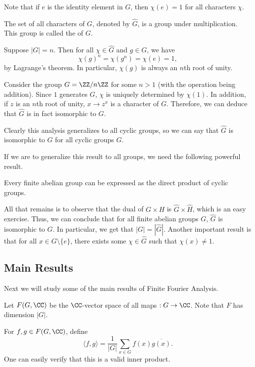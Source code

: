 \documentclass{scrartcl}
\begin{document}
Note that if $e$ is the identity element in $G$, then $\chi (e) = 1$ for all characters $\chi$. 

\begin{definition}
	The set of all characters of $G$, denoted by $\widehat{G}$, is a group under multiplication. 
	This group is called the  of $G$. 
\end{definition}

Suppose $|G|=n$. Then for all $\chi\in \widehat{G}$ and $g\in G$, we have 
$$\chi (g)^n = \chi(g^n) = \chi (e) = 1,$$
by Lagrange's theorem. In particular, $\chi(g)$ is always an $n$th root of unity. 

\begin{example} 
	\label{ex:cyclic}
	Consider the group $G = \ZZ/n\ZZ$ for some $n>1$ (with the operation being addition).
	Since $1$ generates $G$, $\chi$ is uniquely determined by $\chi(1)$. 
	In addition, if $z$ is an $n$th root of unity, $x\rightarrow z^x$ is a character of $G$. 
	Therefore, we can deduce that $\widehat{G}$ is in fact isomorphic to $G$. 
	
	Clearly this analysis generalizes to all cyclic groups, so we can say that $\widehat{G}$ is 
	isomorphic to $G$ for all cyclic groups $G$. 
\end{example}

If we are to generalize this result to all groups, we need the following powerful result.

\begin{theorem}
	Every finite abelian group can be expressed as the direct product of cyclic groups. 
\end{theorem}

All that remains is to observe that the dual of $G\times H$ is $\widehat{G}\times \widehat{H}$, 
which is an easy exercise. Thus, we can conclude that for all finite abelian groups $G$, 
$\widehat{G}$ is isomorphic to $G$. In particular, we get that $|G| = |\widehat{G}|$.
Another important result is that for all $x\in G \setminus \{e\}$, there exists 
some $\chi \in \widehat{G}$ such that $\chi(x)\neq 1$.  

\subsection{Main Results}

Next we will study some of the main results of Finite Fourier Analysis. 

\begin{definition}
	Let $F(G, \CC)$ be the $\CC$-vector space of all maps $: G\rightarrow \CC$. 
	Note that $F$ has dimension $|G|$. 
	
	For $f, g\in F(G, \CC)$, define 
	$$\langle f, g\rangle = \frac{1}{|G|} \sum_{x\in G}f(x) \overline{g(x)}.$$ 
	One can easily verify that this is a valid inner product. 
\end{definition}
\end{document}
